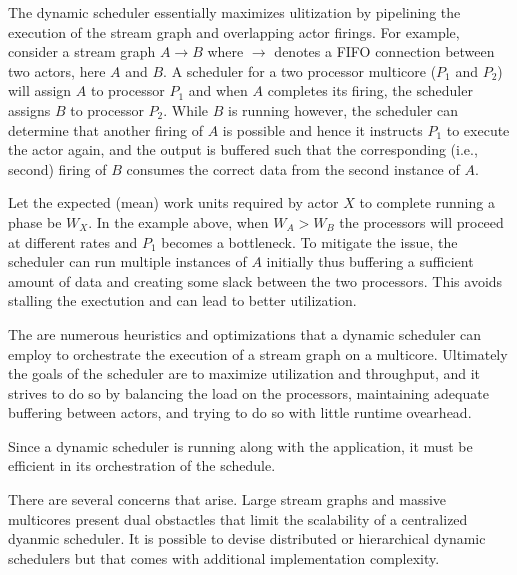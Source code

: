 The dynamic scheduler essentially maximizes ulitization by pipelining
the execution of the stream graph and overlapping actor firings. For
example, consider a stream graph $A\rightarrow B$ where $\rightarrow$
denotes a FIFO connection between two actors, here $A$ and $B$. A
scheduler for a two processor multicore ($P_1$ and $P_2$) will assign
$A$ to processor $P_1$ and when $A$ completes its firing, the
scheduler assigns $B$ to processor $P_2$. While $B$ is running
however, the scheduler can determine that another firing of $A$ is
possible and hence it instructs $P_1$ to execute the actor again, and
the output is buffered such that the corresponding (i.e., second)
firing of $B$ consumes the correct data from the second instance of
$A$.

Let the expected (mean) work units required by actor $X$ to complete
running a phase be $W_X$. In the example above, when $W_A > W_B$
the processors will proceed at different rates and $P_1$ becomes a
bottleneck. To mitigate the issue, the scheduler can run multiple
instances of $A$ initially thus buffering a sufficient amount of data
and creating some slack between the two processors. This avoids
stalling the exectution and can lead to better utilization.

The are numerous heuristics and optimizations that a dynamic scheduler
can employ to orchestrate the execution of a stream graph on a
multicore. Ultimately the goals of the scheduler are to maximize
utilization and throughput, and it strives to do so by balancing the
load on the processors, maintaining adequate buffering between actors,
and trying to do so with little runtime ovearhead.

Since a dynamic scheduler is running along with the application, it
must be efficient in its orchestration of the schedule. 

There are several concerns that arise. Large stream graphs and massive
multicores present dual obstactles that limit the scalability of a
centralized dyanmic scheduler. It is possible to devise distributed or
hierarchical dynamic schedulers but that comes with additional
implementation complexity.


